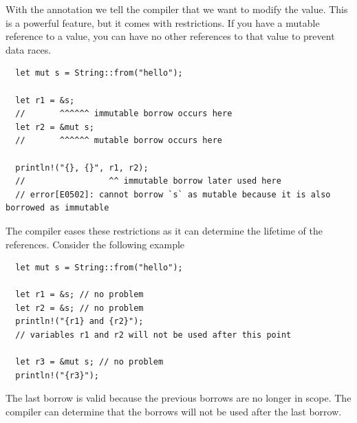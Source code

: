 \documentclass[11pt]{report}
\theoremstyle{definition}
\theoremstyle{plain}
\begin{document}
With the  annotation we tell the compiler that we want to modify the value. This is a powerful feature, but it comes with restrictions. If you have a mutable reference to a value, you can have no other references to that value to prevent data races.
\begin{verbatim}
  let mut s = String::from("hello");

  let r1 = &s;
  //       ^^^^^^ immutable borrow occurs here
  let r2 = &mut s;
  //       ^^^^^^ mutable borrow occurs here

  println!("{}, {}", r1, r2);
  //                 ^^ immutable borrow later used here
  // error[E0502]: cannot borrow `s` as mutable because it is also borrowed as immutable
\end{verbatim}
The compiler eases these restrictions as it can determine the lifetime of the references. Consider the following example
\begin{verbatim}
  let mut s = String::from("hello");

  let r1 = &s; // no problem
  let r2 = &s; // no problem
  println!("{r1} and {r2}");
  // variables r1 and r2 will not be used after this point

  let r3 = &mut s; // no problem
  println!("{r3}");
\end{verbatim}
The last borrow is valid because the previous borrows are no longer in scope. The compiler can determine that the borrows will not be used after the last borrow.
\end{document}
